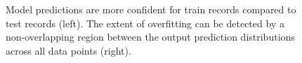 \begin{figure}[!htb]
\begin{minipage}[b]{1\linewidth}

    \end{minipage}
    \caption{Model predictions are more confident for train records compared to test records (left). The extent of overfitting can be detected by a non-overlapping region between the output prediction distributions across all data points (right).}
    \label{fig:NIAcause}
\end{figure}

